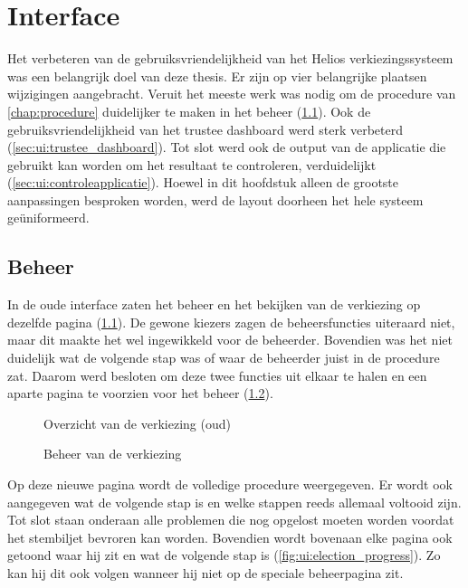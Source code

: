 % 
%

\chapter{Interface}
\label{chap:interface}

Het verbeteren van de gebruiksvriendelijkheid van het Helios verkiezingssysteem was een belangrijk doel van deze thesis. Er zijn op vier belangrijke plaatsen wijzigingen aangebracht. Veruit het meeste werk was nodig om de procedure van \ref{chap:procedure} duidelijker te maken in het beheer (\ref{sec:ui:beheer}). Ook de gebruiksvriendelijkheid van het trustee dashboard werd sterk verbeterd (\ref{sec:ui:trustee_dashboard}). Tot slot werd ook de output van de applicatie die gebruikt kan worden om het resultaat te controleren, verduidelijkt (\ref{sec:ui:controleapplicatie}). Hoewel in dit hoofdstuk alleen de grootste aanpassingen besproken worden, werd de layout doorheen het hele systeem geüniformeerd.

\section{Beheer}
\label{sec:ui:beheer}

In de oude interface zaten het beheer en het bekijken van de verkiezing op dezelfde pagina (\ref{fig:ui:elections_view_old}). De gewone kiezers zagen de beheersfuncties uiteraard niet, maar dit maakte het wel ingewikkeld voor de beheerder. Bovendien was het niet duidelijk wat de volgende stap was of waar de beheerder juist in de procedure zat. Daarom werd besloten om deze twee functies uit elkaar te halen en een aparte pagina te voorzien voor het beheer (\ref{fig:ui:elections_admin}).

\begin{figure}
  \caption{Overzicht van de verkiezing (oud)}
  \label{fig:ui:elections_view_old}
\end{figure}

\begin{figure}
  \caption{Beheer van de verkiezing}
  \label{fig:ui:elections_admin}
\end{figure}

\npar Op deze nieuwe pagina wordt de volledige procedure weergegeven. Er wordt ook aangegeven wat de volgende stap is en welke stappen reeds allemaal voltooid zijn. Tot slot staan onderaan alle problemen die nog opgelost moeten worden voordat het stembiljet bevroren kan worden. Bovendien wordt bovenaan elke pagina ook getoond waar hij zit en wat de volgende stap is (\ref{fig:ui:election_progress}). Zo kan hij dit ook volgen wanneer hij niet op de speciale beheerpagina zit.

